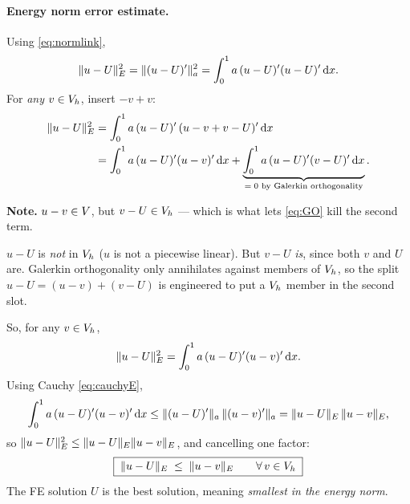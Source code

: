 \paragraph{Energy norm error estimate.} Using \eqref{eq:normlink},
\begin{equation}
  \lVert u-U\rVert_{E}^{2} = \lVert(u-U)'\rVert_{a}^{2}
  = \int_{0}^{1} a\,(u-U)'(u-U)'\,\mathrm{d} x .
\end{equation}
For \emph{any} $v\in V_{h}$, insert $-v+v$:
\begin{align}
  \lVert u-U\rVert_{E}^{2}
  &= \int_{0}^{1} a\,(u-U)'\,(u-v+v-U)'\,\mathrm{d} x \notag\\
  &= \int_{0}^{1} a\,(u-U)'(u-v)'\,\mathrm{d} x
   + \underbrace{\int_{0}^{1} a\,(u-U)'(v-U)'\,\mathrm{d} x}_{=\;0 \text{ by Galerkin orthogonality}} .
\end{align}

\medskip
\noindent\textbf{Note.} $u-v\in V$, but $v-U\in V_{h}$ --- which is what lets
\eqref{eq:GO} kill the second term.

\begin{pitfall}
$u-U$ is \emph{not} in $V_{h}$ ($u$ is not a piecewise linear). But $v-U$
\emph{is}, since both $v$ and $U$ are. Galerkin orthogonality only annihilates
against members of $V_{h}$, so the split $u-U=(u-v)+(v-U)$ is engineered to put a
$V_{h}$ member in the second slot.
\end{pitfall}

\medskip
So, for any $v\in V_{h}$,
\begin{equation}
  \lVert u-U\rVert_{E}^{2} = \int_{0}^{1} a\,(u-U)'(u-v)'\,\mathrm{d} x .
\end{equation}
Using Cauchy \eqref{eq:cauchyE},
\begin{equation}
  \int_{0}^{1} a\,(u-U)'(u-v)'\,\mathrm{d} x \le \lVert(u-U)'\rVert_{a}\,\lVert(u-v)'\rVert_{a}
  = \lVert u-U\rVert_{E}\,\lVert u-v\rVert_{E},
\end{equation}
so $\lVert u-U\rVert_{E}^{2}\le \lVert u-U\rVert_{E}\lVert u-v\rVert_{E}$, and cancelling one
factor:
\begin{equation}\label{eq:cea1}
  \boxed{\;\lVert u-U\rVert_{E} \;\le\; \lVert u-v\rVert_{E} \qquad \forall\, v\in V_{h}\;}
\end{equation}
The FE solution $U$ is the best solution, meaning \emph{smallest in the energy
norm}.


